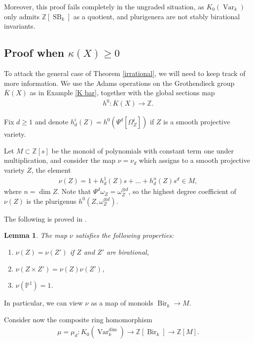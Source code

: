 \documentclass{amsart}
\newtheorem{lem}[thm]{Lemma}
\theoremstyle{definition}
\DeclareMathOperator{\Bir}{Bir}
\DeclareMathOperator{\Var}{Var}
\DeclareMathOperator{\SB}{SB}
\newcommand{\Kdim}{K_0(\Var_k^{\dim})}
\numberwithin{equation}{section}
\begin{document}
Moreover, this proof fails completely in the ungraded situation, as $K_0(\Var_k)$ only admits $\mathbb{Z}[\SB_k]$ as a quotient, and plurigenera are not stably birational invariants.



\subsection{Proof when $\kappa(X) \geq 0$}
To attack the general case of Theorem \ref{irrational}, we will need to keep track of more information. We use the Adams operations on the Grothendieck group $\overline{K}(X)$ as in Example \ref{K bar}, together with the global sections map
\begin{align*}
    h^0: \overline{K}(X) \rightarrow \mathbb{Z}.
\end{align*}

Fix $d \geq 1$ and denote $h_d^i(Z) = h^0(\Psi^d [\Omega_Z^{i}])$ if $Z$ is a smooth projective variety.

Let $M \subset \mathbb{Z}[s]$ be the monoid of polynomials with constant term one under multiplication, and consider the map $\nu = \nu_d$ which assigns to a smooth projective variety $Z$, the element
\begin{align*}
    \nu(Z) = 1+h_d^1(Z)s + \ldots +h_d^n(Z)s^d \in M,
\end{align*}
where $n = \dim Z$. Note that $\Psi^d \omega_Z = \omega_Z^{\otimes d}$, so the highest degree coefficient of $\nu(Z)$ is the plurigenus $h^0(Z, \omega_Z^{\otimes d})$.

The following is proved in \cite[Proposition $6.1$]{larsenluntsrationality}.

\begin{lem}\label{mu defined}
The map $\nu$ satisfies the following properties:
\begin{enumerate}
    \item $\nu(Z) = \nu(Z')$ if $Z$ and $Z'$ are birational,
    \item $\nu(Z \times Z') = \nu(Z) \nu(Z')$, 
    \item $\nu(\mathbb{P}^1)=1$.
\end{enumerate}
\end{lem}
In particular, we can view $\nu$ as a map of monoids $\Bir_k \rightarrow M$.

Consider now the composite ring homomorphism
\begin{align*}
    \mu = \mu_d: \Kdim \rightarrow \mathbb{Z}[\Bir_k] \rightarrow \mathbb{Z}[M].
\end{align*}
\end{document}
